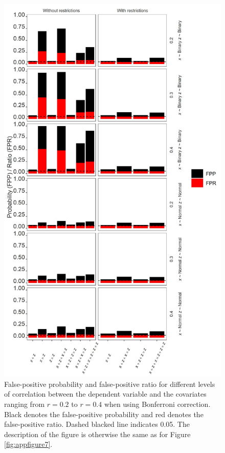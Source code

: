 \begin{landscape}
\begin{figure}[ht!]
\includegraphics[scale=0.65]{R/Analysis/Result/Figures/Figure2SIBon.jpeg}
\centering
\caption{False-positive probability and false-positive ratio for different levels of correlation between the dependent variable and the covariates ranging from  $\textit{r}=0.2$ to  $\textit{r}=0.4$ when using Bonferroni correction. Black denotes the false-positive probability and red denotes the false-positive ratio. Dashed blacked line indicates 0.05. The description of the figure is otherwise the same as for Figure \ref{fig:appfigure7}.}
\label{fig:appfigure8}
\end{figure}
\end{landscape}



